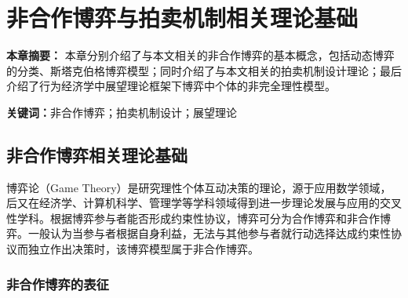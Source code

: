 \chapter{非合作博弈与拍卖机制相关理论基础}

\textbf{本章摘要：} 
本章分别介绍了与本文相关的非合作博弈的基本概念，包括动态博弈的分类、斯塔克伯格博弈模型；同时介绍了与本文相关的拍卖机制设计理论；最后介绍了行为经济学中展望理论框架下博弈中个体的非完全理性模型。


\textbf{关键词：}非合作博弈；拍卖机制设计；展望理论


\section{非合作博弈相关理论基础}\label{sec:game}
博弈论（Game Theory）是研究理性个体互动决策的理论，源于应用数学领域，后又在经济学、计算机科学、管理学等学科领域得到进一步理论发展与应用的交叉性学科。根据博弈参与者能否形成约束性协议，博弈可分为合作博弈和非合作博弈。一般认为当参与者根据自身利益，无法与其他参与者就行动选择达成约束性协议而独立作出决策时，该博弈模型属于非合作博弈。

\subsection{非合作博弈的表征}

